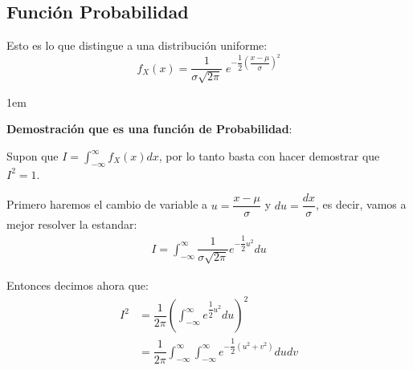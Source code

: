 \documentclass[12pt, fleqn]{report}                             %
\newenvironment{SmallIndentation}[1][0.75em]                    %
        {\begin{adjustwidth}{#1}{}\begin{footnotesize}}             %
        {\end{footnotesize}\end{adjustwidth}}                       %
\theoremstyle{break}                                            %
\newcommand{\Wrap}[1]{\left( #1 \right)}                        %
\newcommand{\pfrac}[2]{\Wrap{\dfrac{#1}{#2}}}                   %
\begin{document}
            \subsection{Función Probabilidad}

                Esto es lo que distingue a una distribución uniforme:
                \begin{equation*}
                    f_X(x) = \dfrac{1}{\sigma \sqrt{2\pi}} \; e^{-\dfrac{1}{2}\pfrac{x - \mu}{\sigma}^2 }
                \end{equation*}

                \begin{SmallIndentation}[1em]
                    \textbf{Demostración que es una función de Probabilidad}:
                    
                    Supon que $I = \int_{-\infty}^\infty f_X(x) dx$, por lo tanto basta con hacer
                    demostrar que $I^2 = 1$.

                    Primero haremos el cambio de variable a $u = \dfrac{x - \mu}{\sigma}$
                    y $du = \dfrac{dx}{\sigma}$, es decir, vamos a mejor resolver la estandar:
                    \begin{align*}
                        I
                            = \int_{-\infty}^\infty 
                                    \dfrac{1}{\sigma \sqrt{2\pi}} 
                                        e^{-\dfrac{1}{2}u^2 } du
                    \end{align*}

                    Entonces decimos ahora que:
                    \begin{align}
                        I^2
                            &= \dfrac{1}{2\pi} \Wrap{\int_{-\infty}^\infty e^{\dfrac{1}{2}u^2} du}^2    \\
                            &= \dfrac{1}{2\pi} 
                                \int_{-\infty}^\infty 
                                    \int_{-\infty}^\infty e^{-\dfrac{1}{2}(u^2 + v^2)} du dv 
                    \end{align}


\end{SmallIndentation}
\end{document}
